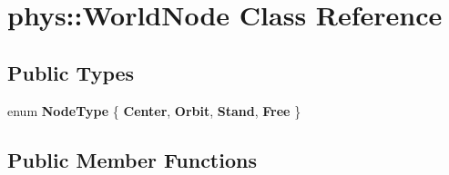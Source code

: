 \hypertarget{classphys_1_1WorldNode}{
\section{phys::WorldNode Class Reference}
\label{d2/d3e/classphys_1_1WorldNode}
}
\subsection*{Public Types}
\begin{DoxyCompactItemize}
\item 
enum {\bfseries NodeType} \{ {\bfseries Center}, 
{\bfseries Orbit}, 
{\bfseries Stand}, 
{\bfseries Free}
 \}
\end{DoxyCompactItemize}
\subsection*{Public Member Functions}
